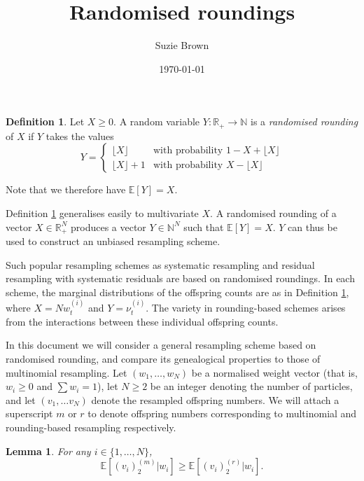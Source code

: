 \documentclass[fleqn]{article}
\title{Randomised roundings}
\author{Suzie Brown}
\date{\today}
\newtheorem{lemma}{Lemma}
\theoremstyle{definition}
\newtheorem{defn}{Definition}
\newcommand{\E}{\mathbb{E}}
\newcommand{\vt}[2][t]{\nu_{#1}^{(#2)}}
\newcommand{\wt}[2][t]{w_{#1}^{(#2)}}
\begin{document}
\maketitle
\thispagestyle{fancy}

\begin{defn}\label{defn:randround_1D}
Let $X\geq0$. A random variable $Y: \mathbb{R}_+ \to \mathbb{N}$ is a \emph{randomised rounding} of $X$ if $Y$ takes the values
\begin{equation*}
Y=
\begin{cases}
 \lfloor X \rfloor & \text{with probability } 1- X+ \lfloor X \rfloor \\
  \lfloor X \rfloor +1 & \text{with probability } X- \lfloor X \rfloor 
\end{cases}
\end{equation*}
\end{defn}
Note that we therefore have $\E[Y] =X$.

Definition \ref{defn:randround_1D} generalises easily to multivariate $X$. A randomised rounding of a vector $X \in \mathbb{R}_+^N$ produces a vector $Y \in \mathbb{N}^N$ such that $\E[Y]=X$. $Y$ can thus be used to construct an unbiased resampling scheme.

Such popular resampling schemes as systematic resampling and residual resampling with systematic residuals are based on randomised roundings. In each scheme, the marginal distributions of the offspring counts are as in Definition \ref{defn:randround_1D}, where $X=N\wt{i}$ and $Y=\vt{i}$. The variety in rounding-based schemes arises from the interactions between these individual offspring counts. 

In this document we will consider a general resampling scheme based on randomised rounding, and compare its genealogical properties to those of multinomial resampling.
Let $(w_1, \dots, w_N)$ be a normalised weight vector (that is, $w_i \geq 0$ and $\sum w_i = 1$), let $N\geq 2$ be an integer denoting the number of particles, and let $(v_1,\dots v_N)$ denote the resampled offspring numbers. We will attach a superscript $m$ or $r$ to denote offspring numbers corresponding to multinomial and rounding-based resampling respectively.

\begin{lemma}
For any $i \in \{1, \dots, N\}$,
\begin{equation*}
\E[(v_i)_2^{(m)} | w_i] \geq \E[(v_i)_2^{(r)} | w_i].
\end{equation*}
\end{lemma}
\end{document}
